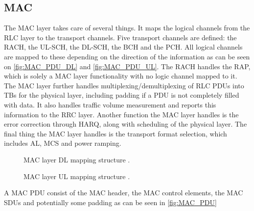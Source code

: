 \subsection{MAC}

The \gls{MAC} layer takes care of several things. It maps the logical channels from the RLC layer to the transport channels. Five transport channels are defined: the \gls{RACH}, the \gls{UL-SCH}, the \gls{DL-SCH}, the \gls{BCH} and the \gls{PCH}. All logical channels are mapped to these depending on the direction of the information as can be seen on \autoref{fig:MAC_PDU_DL} and \autoref{fig:MAC_PDU_UL}. The \gls{RACH} handles the \gls{RAP}, which is solely a \gls{MAC} layer functionality with no logic channel mapped to it. The \gls{MAC} layer further handles multiplexing/demultiplexing of \gls{RLC} \gls{PDU}s into \gls{TB}s for the physical layer, including padding if a \gls{PDU} is not completely filled with data. It also handles traffic volume measurement and reports this information to the \gls{RRC} layer. Another function the \gls{MAC} layer handles is the error correction through \gls{HARQ}, along with scheduling of the physical layer. The final thing the \gls{MAC} layer handles is the transport format selection, which includes \gls{AL}, \gls{MCS} and power ramping.  

\captionsetup{belowskip=0em}
\begin{minipage}{0.48\textwidth}
	\begin{figure}[H]
	\centering
	\resizebox{\textwidth}{!}{
	}
	\caption{\gls{MAC} layer \gls{DL} mapping structure \citep[Sec. 6.3]{book_LTE_for_UMTS}.}
	\label{fig:MAC_PDU_DL}
	\end{figure}
\end{minipage}
\begin{minipage}{0.48\textwidth}
	\begin{figure}[H]
	\centering
	\resizebox{\textwidth}{!}{
	}
	\caption{\gls{MAC} layer \gls{UL} mapping structure \citep[Sec. 6.3]{book_LTE_for_UMTS}.}
	\label{fig:MAC_PDU_UL}
	\end{figure}
\end{minipage}
\captionsetup{belowskip=-1.5em}

A \gls{MAC} \gls{PDU} consist of the \gls{MAC} header, the \gls{MAC} control elements, the \gls{MAC} \gls{SDU}s and potentially some padding as can be seen in \autoref{fig:MAC_PDU}


